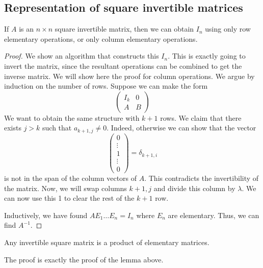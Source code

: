 \subsection{Representation of square invertible matrices}
\begin{lemma}
	If \( A \) is an \( n \times n \) square invertible matrix, then we can obtain \( I_n \) using only row elementary operations, or only column elementary operations.
\end{lemma}
\begin{proof}
	We show an algorithm that constructs this \( I_n \).
	This is exactly going to invert the matrix, since the resultant operations can be combined to get the inverse matrix.
	We will show here the proof for column operations.
	We argue by induction on the number of rows.
	Suppose we can make the form
	\[
		\begin{pmatrix} I_k & 0 \\ A & B \end{pmatrix}
	\]
	We want to obtain the same structure with \( k+1 \) rows.
	We claim that there exists \( j > k \) such that \( a_{k+1,j} \neq 0 \).
	Indeed, otherwise we can show that the vector
	\[
		\begin{pmatrix} 0 \\ \vdots \\ 1 \\ \vdots \\ 0 \end{pmatrix} = \delta_{k+1,i}
	\]
	is not in the span of the column vectors of \( A \).
	This contradicts the invertibility of the matrix.
	Now, we will swap columns \( k+1, j \) and divide this column by \( \lambda \).
	We can now use this 1 to clear the rest of the \( k+1 \) row.

	Inductively, we have found \( A E_1 \dots E_n = I_n \) where \( E_n \) are elementary.
	Thus, we can find \( A^{-1} \).
\end{proof}
\begin{proposition}
	Any invertible square matrix is a product of elementary matrices.
\end{proposition}
The proof is exactly the proof of the lemma above.
